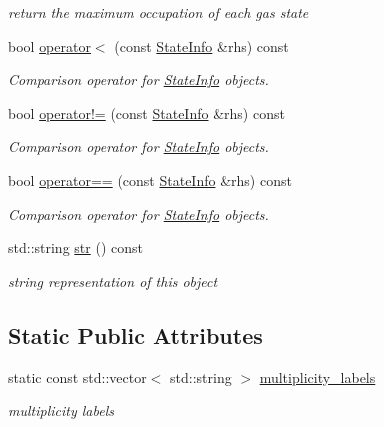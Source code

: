 \begin{DoxyCompactItemize}
\begin{DoxyCompactList}\small\item\em return the maximum occupation of each gas state \end{DoxyCompactList}\item 
bool \mbox{\hyperlink{classforte_1_1_state_info_a95242f2ef492eeb6740da98144039329}{operator$<$}} (const \mbox{\hyperlink{classforte_1_1_state_info}{State\+Info}} \&rhs) const
\begin{DoxyCompactList}\small\item\em Comparison operator for \mbox{\hyperlink{classforte_1_1_state_info}{State\+Info}} objects. \end{DoxyCompactList}\item 
bool \mbox{\hyperlink{classforte_1_1_state_info_a3be1e8e4f810dcf3de3413ca17e607b5}{operator!=}} (const \mbox{\hyperlink{classforte_1_1_state_info}{State\+Info}} \&rhs) const
\begin{DoxyCompactList}\small\item\em Comparison operator for \mbox{\hyperlink{classforte_1_1_state_info}{State\+Info}} objects. \end{DoxyCompactList}\item 
bool \mbox{\hyperlink{classforte_1_1_state_info_a8c20c22bb6cebf7f9c3a1238a4012bda}{operator==}} (const \mbox{\hyperlink{classforte_1_1_state_info}{State\+Info}} \&rhs) const
\begin{DoxyCompactList}\small\item\em Comparison operator for \mbox{\hyperlink{classforte_1_1_state_info}{State\+Info}} objects. \end{DoxyCompactList}\item 
std\+::string \mbox{\hyperlink{classforte_1_1_state_info_a50b10a54b40621ef6147a8a1558665b5}{str}} () const
\begin{DoxyCompactList}\small\item\em string representation of this object \end{DoxyCompactList}\end{DoxyCompactItemize}
\subsection*{Static Public Attributes}
\begin{DoxyCompactItemize}
\item 
static const std\+::vector$<$ std\+::string $>$ \mbox{\hyperlink{classforte_1_1_state_info_a435a4361da5759caff8c08fe80a89e54}{multiplicity\+\_\+labels}}
\begin{DoxyCompactList}\small\item\em multiplicity labels \end{DoxyCompactList}\end{DoxyCompactItemize}


